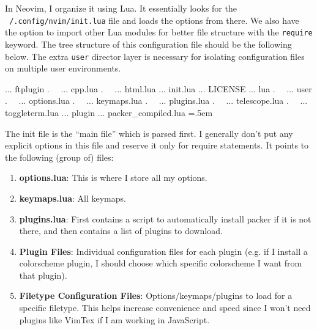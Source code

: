 \documentclass{article}
\theoremstyle{definition}
\newenvironment{cverbatim}
    {\SaveVerbatim{cverb}}
    {\endSaveVerbatim
    \flushleft\fboxrule=0pt\fboxsep=.5em
    \colorbox{cverbbg}{%
      \makebox[\dimexpr\linewidth-2\fboxsep][l]{\BUseVerbatim{cverb}}%
    }
    \endflushleft
  }
\begin{document}
    In Neovim, I organize it using Lua. It essentially looks for the \texttt{~/.config/nvim/init.lua} file and loads the options from there. We also have the option to import other Lua modules for better file structure with the \texttt{require} keyword. The tree structure of this configuration file should be the following below. The extra \texttt{user} director layer is necessary for isolating configuration files on multiple user environments.  
    
    \begin{cverbatim}
      ... ftplugin
      .   ... cpp.lua
      .   ... html.lua
      ... init.lua
      ... LICENSE
      ... lua
      .   ... user
      .       ... options.lua
      .       ... keymaps.lua
      .       ... plugins.lua
      .       ... telescope.lua
      .       ... toggleterm.lua
      ... plugin
          ... packer_compiled.lua
    \end{cverbatim}

    The init file is the ``main file'' which is parsed first. I generally don't put any explicit options in this file and reserve it only for require statements. It points to the following (group of) files: 
    \begin{enumerate}
      \item \textbf{options.lua}: This is where I store all my options. 
      \item \textbf{keymaps.lua}: All keymaps. 
      \item \textbf{plugins.lua}: First contains a script to automatically install packer if it is not there, and then contains a list of plugins to download. 
      \item \textbf{Plugin Files}: Individual configuration files for each plugin (e.g. if I install a colorscheme plugin, I should choose which specific colorscheme I want from that plugin). 
      \item \textbf{Filetype Configuration Files}: Options/keymaps/plugins to load for a specific filetype. This helps increase convenience and speed since I won't need plugins like VimTex if I am working in JavaScript. 
    \end{enumerate}
\end{document}
